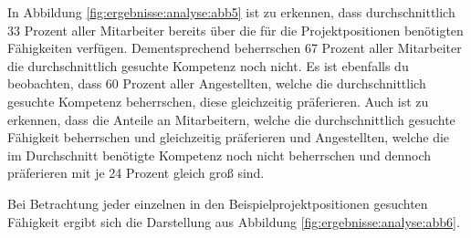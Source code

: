 In Abbildung \ref{fig:ergebnisse:analyse:abb5} ist zu erkennen, dass durchschnittlich 33 Prozent aller Mitarbeiter bereits über die für die Projektpositionen benötigten Fähigkeiten verfügen. Dementsprechend beherrschen 67 Prozent aller Mitarbeiter die durchschnittlich gesuchte Kompetenz noch nicht. Es ist ebenfalls du beobachten, dass 60 Prozent aller Angestellten, welche die durchschnittlich gesuchte Kompetenz beherrschen, diese gleichzeitig präferieren. Auch ist zu erkennen, dass die Anteile an Mitarbeitern, welche die durchschnittlich gesuchte Fähigkeit beherrschen und gleichzeitig präferieren und Angestellten, welche die im Durchschnitt benötigte Kompetenz noch nicht beherrschen und dennoch präferieren mit je 24 Prozent gleich groß sind.

Bei Betrachtung jeder einzelnen in den Beispielprojektpositionen gesuchten Fähigkeit ergibt sich die Darstellung aus Abbildung \ref{fig:ergebnisse:analyse:abb6}.

